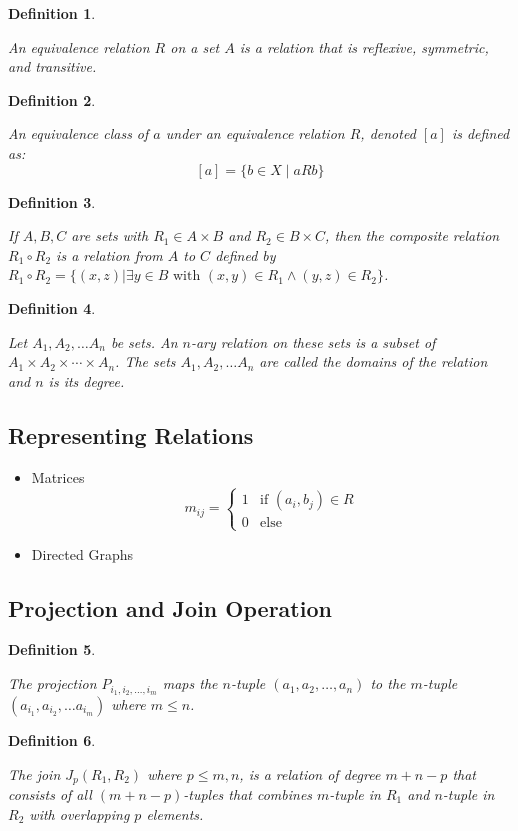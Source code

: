 \documentclass[12pt]{article}
\newtheorem{definition}{Definition} [section]
\begin{document}
\begin{definition}
\begin{em}
An \emph{equivalence relation} $R$ on a set $A$ is a relation that is reflexive, symmetric, and transitive.
\end{em}
\end{definition}
\begin{definition}
\begin{em}
An \emph{equivalence class} of $a$ under an equivalence relation $R$, denoted $[a]$ is defined as:
\[[a] = \{b \in X \; | \; a R b\}\]
\end{em}
\end{definition}
\begin{definition}
\begin{em}
If $A, B, C$ are sets with $R_1 \in A \times B$ and $R_2 \in B \times C$, then the \emph{composite relation} $R_1 \circ R_2$ is a relation from $A$ to $C$ defined by $R_1 \circ R_2 = \{(x, z)|\exists y \in B \text{ with } (x, y) \in R_1 \wedge (y, z) \in R_2\}$.
\end{em}
\end{definition}
\begin{definition}
\begin{em}
Let $A_1, A_2, \dots A_n$ be sets. An $n$-ary relation on these sets is a subset of $A_1 \times A_2 \times \cdots \times A_n$. The sets $A_1, A_2, \dots A_n$ are called the domains of the relation and $n$ is its degree.
\end{em}
\end{definition}
\subsection{Representing Relations}
\begin{itemize}
\item
Matrices\\
\[m_{ij} = \begin{cases} 1& \text{if } (a_i, b_j) \in R\\0& \text{else}\end{cases}\]
\item Directed Graphs
\end{itemize}
\subsection{Projection and Join Operation}
\begin{definition}
\begin{em}
The \emph{projection} $P_{i_1, i_2, \dots, i_m}$ maps the $n$-tuple $(a_1, a_2, \dots, a_n)$ to the $m$-tuple $(a_{i_1}, a_{i_2}, \dots a_{i_m})$ where $m \leq n$.
\end{em}
\end{definition}
\begin{definition}
\begin{em}
The \emph{join} $J_p (R_1, R_2)$ where $p \leq m, n$, is a relation of degree $m+n-p$ that consists of all $(m+n-p)$-tuples that combines $m$-tuple in $R_1$ and $n$-tuple in $R_2$ with overlapping $p$ elements.
\end{em}
\end{definition}
\end{document}
